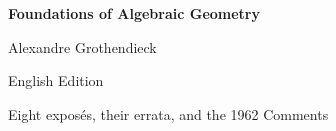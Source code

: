 \documentclass[11pt,twoside,openany]{book}
\begin{document}
\frontmatter
\begin{titlepage}
  \centering
  \vspace*{0.16\textheight}
  {\Huge\bfseries Foundations of Algebraic Geometry\par}
  \vspace{1.2\baselineskip}
  {\Large Alexandre Grothendieck\par}
  \vfill
  {\large English Edition\par}
  \vspace{0.5\baselineskip}
  {\normalsize Eight exposés, their errata, and the 1962 Comments\par}
\end{titlepage}
\tableofcontents
\mainmatter

















\end{document}
